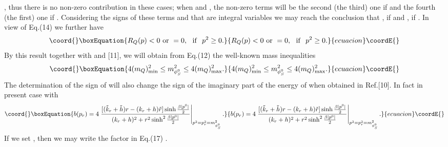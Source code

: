 \documentclass[twocolumn,prd,showpacs,a4paper]{revtex4}
\begin{document}
\coordHE{}, thus there is no 
non-zero contribution in these cases; when \coordHE{} and \coordHE{} 
\coordHE{}, the non-zero terms will be the second (the third) one if \coordHE{}
and the fourth (the first) one if \coordHE{}. Considering the signs of these terms and 
that \coordHE{} are integral variables we may reach the 
conclusion that \coordHE{}, if \coordHE{} and \coordHE{}, if \coordHE{}. In view 
of Eq.(14) we further have 
\begin{equation}\coord{}\boxEquation{
R_Q(p)<0 \ {\rm or} \ =0,\ \ {\rm if} \ \ p^2\geq 0.
}{
R_Q(p)<0 \ {\rm or} \ =0,\ \ {\rm if} \ \ p^2\geq 0.
}{ecuacion}\coordE{}\end{equation}%
By this result together with \coordHE{} and \coordHE{} [11], we will obtain from 
Eq.(12) the well-known mass inequalities
\begin{equation}\coord{}\boxEquation{
4(m_Q)^2_{\rm min}\leq m^2_{\phi_S^0} \leq 4(m_Q)^2_{\rm max}.
}{
4(m_Q)^2_{\rm min}\leq m^2_{\phi_S^0} \leq 4(m_Q)^2_{\rm max}.
}{ecuacion}\coordE{}\end{equation}%
The determination of the sign of \coordHE{} will also change the sign of the imaginary
 part \coordHE{} of the energy of \coordHE{} when \coordHE{} obtained 
in Ref.[10]. In fact in present case \coordHE{} with
\begin{equation}\coord{}\boxEquation{
b(p_r)=4\left.\frac{[(\tilde{k}_r+\tilde{h})r-(k_r+h)\tilde{r}]\sinh\frac{\beta|p^0|}{2}}        {(k_r+h)^2+r^2\sinh^2\frac{\beta|p^0|}{2}}\right|_{p^2=p^2_r=m^2_{\phi_S^0}}.
}{
b(p_r)=4\left.\frac{[(\tilde{k}_r+\tilde{h})r-(k_r+h)\tilde{r}]\sinh\frac{\beta|p^0|}{2}}        {(k_r+h)^2+r^2\sinh^2\frac{\beta|p^0|}{2}}\right|_{p^2=p^2_r=m^2_{\phi_S^0}}.
}{ecuacion}\coordE{}\end{equation}%
If we set \coordHE{}, then we may write the factor in Eq.(17)
\coordHE{}.
\end{document}
